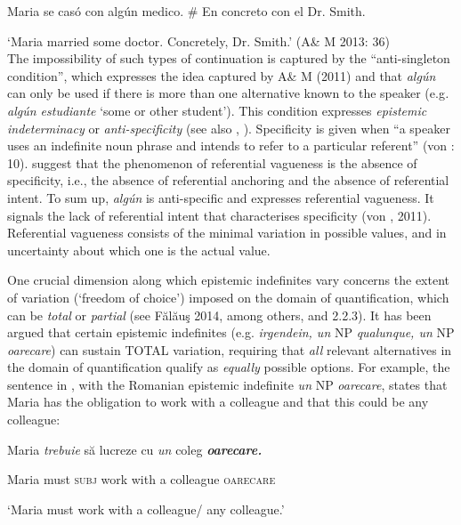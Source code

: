 \label{bkm:Ref533761877}  Maria se casó con algún medico. \# En concreto con el Dr. Smith.

  ‘Maria married some doctor. Concretely, Dr. Smith.’
\gll  \textup{(A\& M 2013: 36)} \\
The impossibility of such types of continuation is captured by the “anti-singleton condition”, which expresses the idea captured by A\& M (2011) and \citet{GiannakidouQuer2013} that \textit{algún} can only be used if there is more than one alternative known to the speaker (e.g\textit{. algún estudiante} ‘some or other student’). This condition expresses \textit{epistemic indeterminacy} or \textit{anti-specificity} (see also \citealt{GiannakidouQuer2013}, \citealt{EtxeberriaGiannakidou2017}). Specificity is given when “a speaker uses an indefinite noun phrase and intends to refer to a particular referent” (von \citealt{Heusinger2011}: 10). \citet{GiannakidouQuer2013} suggest that the phenomenon of referential vagueness is the absence of specificity, i.e., the absence of referential anchoring and the absence of referential intent. To sum up, \textit{algún} is anti-specific and expresses referential vagueness. It signals the lack of referential intent that characterises specificity (von \citealt{Heusinger2002,Heusinger2007}, 2011). Referential vagueness consists of the minimal variation in possible values, and in uncertainty about which one is the actual value. 

  One crucial dimension along which epistemic indefinites vary concerns the extent of variation (‘freedom of choice’) imposed on the domain of quantification, which can be \textit{total} or \textit{partial} (see Fălăuş 2014, among others, and 2.2.3). It has been argued that certain epistemic indefinites (e.g. \textit{irgendein, un} NP \textit{qualunque, un} NP \textit{oarecare}) can sustain TOTAL variation, requiring that \textit{all} relevant alternatives in the domain of quantification qualify as \textit{equally} possible options. For example, the sentence in , with the Romanian epistemic indefinite \textit{un} NP \textit{oarecare}, states that Maria has the obligation to work with a colleague and that this could be any colleague:

\label{bkm:Ref533761905}  Maria  \textit{trebuie}  să  lucreze  cu  \textit{un}  coleg  \textbf{\textit{oarecare.}}

  Maria  must  \textsc{subj}  work  with  a  colleague  \textsc{oarecare}

  ‘Maria must work with a colleague/ any colleague.’

